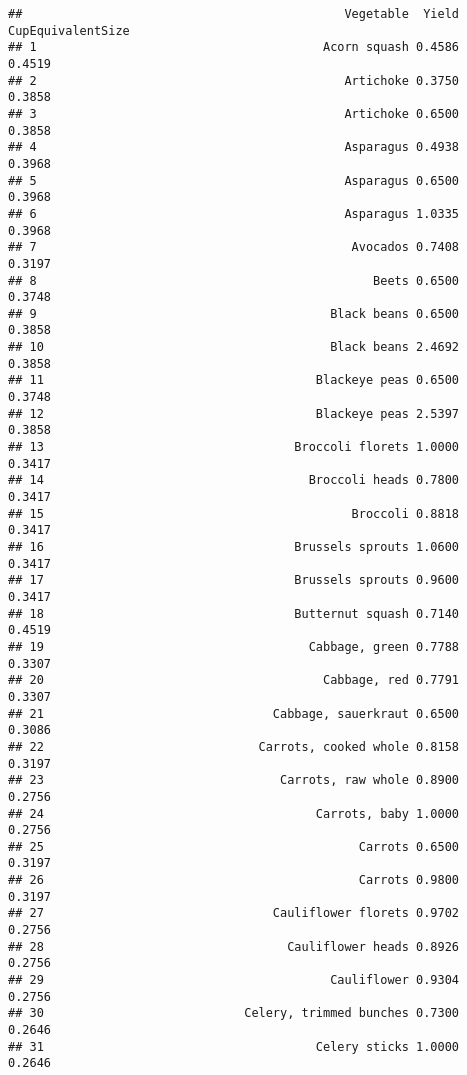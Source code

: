 \documentclass[
]{article}
\begin{document}
\begin{verbatim}
##                                             Vegetable  Yield CupEquivalentSize
## 1                                        Acorn squash 0.4586            0.4519
## 2                                           Artichoke 0.3750            0.3858
## 3                                           Artichoke 0.6500            0.3858
## 4                                           Asparagus 0.4938            0.3968
## 5                                           Asparagus 0.6500            0.3968
## 6                                           Asparagus 1.0335            0.3968
## 7                                            Avocados 0.7408            0.3197
## 8                                               Beets 0.6500            0.3748
## 9                                         Black beans 0.6500            0.3858
## 10                                        Black beans 2.4692            0.3858
## 11                                      Blackeye peas 0.6500            0.3748
## 12                                      Blackeye peas 2.5397            0.3858
## 13                                   Broccoli florets 1.0000            0.3417
## 14                                     Broccoli heads 0.7800            0.3417
## 15                                           Broccoli 0.8818            0.3417
## 16                                   Brussels sprouts 1.0600            0.3417
## 17                                   Brussels sprouts 0.9600            0.3417
## 18                                   Butternut squash 0.7140            0.4519
## 19                                     Cabbage, green 0.7788            0.3307
## 20                                       Cabbage, red 0.7791            0.3307
## 21                                Cabbage, sauerkraut 0.6500            0.3086
## 22                              Carrots, cooked whole 0.8158            0.3197
## 23                                 Carrots, raw whole 0.8900            0.2756
## 24                                      Carrots, baby 1.0000            0.2756
## 25                                            Carrots 0.6500            0.3197
## 26                                            Carrots 0.9800            0.3197
## 27                                Cauliflower florets 0.9702            0.2756
## 28                                  Cauliflower heads 0.8926            0.2756
## 29                                        Cauliflower 0.9304            0.2756
## 30                            Celery, trimmed bunches 0.7300            0.2646
## 31                                      Celery sticks 1.0000            0.2646

\end{verbatim}
\end{document}
